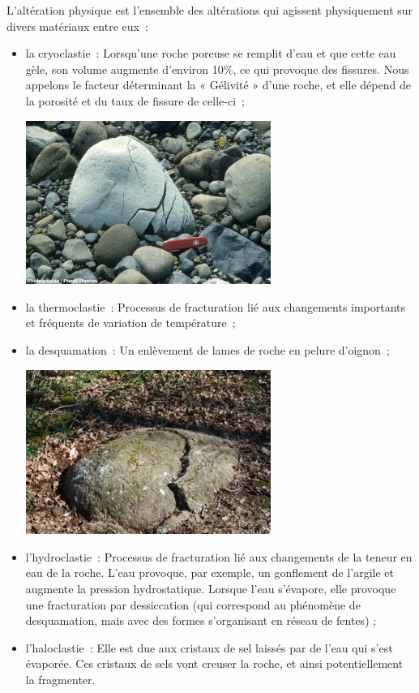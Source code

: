 \documentclass[a4paper,11pt]{article}
\begin{document}
L'altération physique est l'ensemble des altérations qui agissent physiquement sur divers matériaux entre eux~:
\begin{itemize}
  \item la cryoclastie~: Lorsqu'une roche poreuse se remplit d'eau et que cette eau gèle, son volume augmente d'environ 10\%, ce qui provoque des fissures.
  Nous appelons le facteur déterminant la « Gélivité » d'une roche, et elle dépend de la porosité et du taux de fissure de celle-ci~;

  \medbreak
  \begin{center}
    \includegraphics[width=8cm]{Images/Erosion/cryoclastie.jpg}
  \end{center}
  \medbreak

  \item la thermoclastie~: Processus de fracturation lié aux changements importants et fréquents de variation de température~;
  \item la desquamation~: Un enlèvement de lames de roche en pelure d'oignon~;

  \medbreak
  \begin{center}
    \includegraphics[width=8cm]{Images/Erosion/desquamation.jpg}
  \end{center}
  \medbreak
  
  \item l'hydroclastie~: Processus de fracturation lié aux changements de la teneur en eau de la roche. L'eau provoque, par exemple, un gonflement de l'argile et augmente la pression hydrostatique.
  Lorsque l'eau s'évapore, elle provoque une fracturation par dessiccation (qui correspond au phénomène de desquamation, mais avec des formes s'organisant en réseau de fentes) ;
  \item l'haloclastie~: Elle est due aux cristaux de sel laissés par de l'eau qui s'est évaporée. Ces cristaux de sels vont creuser la roche, et ainsi potentiellement la fragmenter.


\end{itemize}
\end{document}
